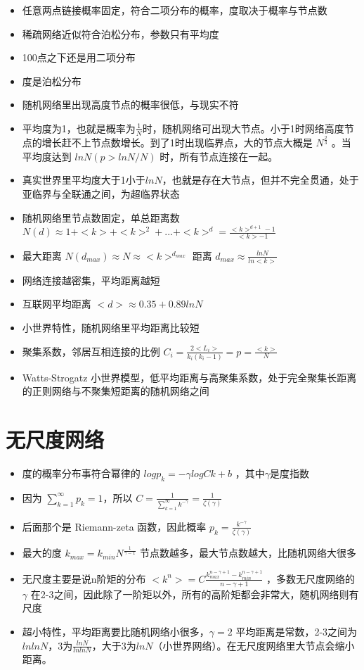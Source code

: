 \documentclass[]{book}
\providecommand{\tightlist}{%
  \setlength{\itemsep}{0pt}\setlength{\parskip}{0pt}}
\begin{document}
\begin{itemize}
\tightlist
\item
  任意两点链接概率固定，符合二项分布的概率，度取决于概率与节点数
\item
  稀疏网络近似符合泊松分布，参数只有平均度
\item
  100点之下还是用二项分布
\item
  度是泊松分布
\item
  随机网络里出现高度节点的概率很低，与现实不符
\item
  平均度为1，也就是概率为\(\frac{1}{N}\)时，随机网络可出现大节点。小于1时网络高度节点的增长赶不上节点数增长。到了1时出现临界点，大的节点大概是 \(N^{\frac{2}{3}}\) 。当平均度达到 \(lnN(p>lnN/N)\) 时，所有节点连接在一起。
\item
  真实世界里平均度大于1小于\(lnN\)，也就是存在大节点，但并不完全贯通，处于亚临界与全联通之间，为超临界状态
\item
  随机网络里节点数固定，单总距离数 \(N(d)\approx 1+<k>+<k>^2+...+<k>^d = \frac{<k>^{d+1}-1}{<k>-1}\)
\item
  最大距离 \(N(d_{max})\approx N \approx <k>^{d_{max}}\) 距离 \(d_{max} \approx\frac{lnN}{ln<k>}\)
\item
  网络连接越密集，平均距离越短
\item
  互联网平均距离 \(<d> \approx 0.35+0.89lnN\)
\item
  小世界特性，随机网络里平均距离比较短
\item
  聚集系数，邻居互相连接的比例 \(C_i = \frac{2<L_i>}{k_i(k_i-1)} = p = \frac{<k>}{N}\)
\item
  Watts-Strogatz 小世界模型，低平均距离与高聚集系数，处于完全聚集长距离的正则网络与不聚集短距离的随机网络之间
\end{itemize}

\hypertarget{ux65e0ux5c3aux5ea6ux7f51ux7edc}{%
\section{无尺度网络}\label{ux65e0ux5c3aux5ea6ux7f51ux7edc}}

\begin{itemize}
\tightlist
\item
  度的概率分布事符合幂律的 \(log p_k = -\gamma logCk+b\) ，其中\(\gamma\)是度指数
\item
  因为 \(\sum_{k=1}^\infty p_k = 1\)，所以 \(C = \frac{1}{\sum_{k=1}^{\infty}k^{-\gamma}} = \frac{1}{\zeta(\gamma)}\)
\item
  后面那个是 Riemann-zeta 函数，因此概率 \(p_k = \frac{k^{-\gamma}}{\zeta(\gamma)}\)
\item
  最大的度 \(k_{max} = k_{min}N^{\frac{1}{\gamma -1}}\) 节点数越多，最大节点数越大，比随机网络大很多
\item
  无尺度主要是说n阶矩的分布 \(<k^n> = C\frac{k_{max}^{n-\gamma+1} - k_{min}^{n-\gamma+1}}{n-\gamma+1}\) ，多数无尺度网络的 \(\gamma\) 在2-3之间，因此除了一阶矩以外，所有的高阶矩都会非常大，随机网络则有尺度
\item
  超小特性，平均距离要比随机网络小很多，\(\gamma =2\) 平均距离是常数，2-3之间为\(lnlnN\)，3为\(\frac{lnN}{lnlnN}\)，大于3为\(lnN\)（小世界网络）。在无尺度网络里大节点会缩小距离。
\end{itemize}
\end{document}
